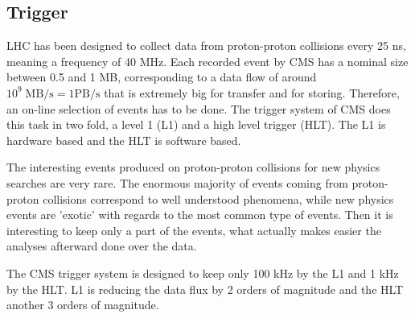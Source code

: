 %
%
%
\subsection{Trigger}
\label{sec:trigger}

LHC has been designed to collect data from proton-proton collisions every 25 ns, meaning a frequency of 40 MHz. Each recorded event by CMS has a nominal size between 0.5 and 1 MB, corresponding to a data flow of around $10^{9}\; \text{MB/s}= 1\text{PB/s}$ that is extremely big for transfer and for storing. Therefore, an on-line selection of events has to be done. The trigger system of CMS does this task in two fold, a level 1 (L1) and a high level trigger (HLT). The L1 is hardware based and the HLT is software based. 

The interesting events produced on proton-proton collisions for new physics searches are very rare. The enormous majority of events coming from proton-proton collisions correspond to well understood phenomena, while new physics events are 'exotic' with regards to the most common type of events. Then it is interesting to keep only a part of the events, what actually makes easier the analyses afterward done over the data. 

The CMS trigger system is designed to keep only 100 kHz by the L1 and 1 kHz by the HLT. L1 is reducing the data flux by 2 orders of magnitude and the HLT another 3 orders of magnitude.
%

